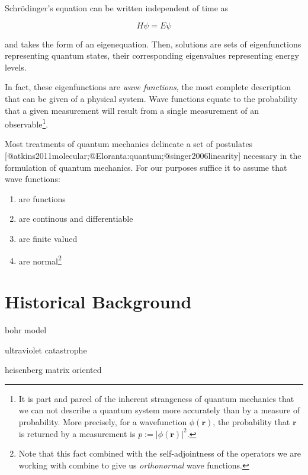 \documentclass[12pt,]{book}
\newenvironment{Shaded}{}{}
\providecommand{\tightlist}{%
  \setlength{\itemsep}{0pt}\setlength{\parskip}{0pt}}
\begin{document}
Schrödinger's equation can be written independent of time as

\begin{equation}H\psi=E\psi\label{eq:time_independent_schrodinger}\end{equation}

and takes the form of an eigenequation. Then, solutions are sets of
eigenfunctions representing quantum states, their corresponding
eigenvalues representing energy levels.

In fact, these eigenfunctions are \emph{wave functions}, the most
complete description that can be given of a physical system. Wave
functions equate to the probability that a given measurement will result
from a single measurement of an
observable\footnote{It is part and parcel of the inherent strangeness of quantum mechanics that we can not describe a quantum system more accurately than by a measure of probability. More precisely, for a wavefunction $\phi(\mathbf{r})$, the probability that $\mathbf{r}$ is returned by a measurement is $p:=\rvert \phi(\mathbf{r})\rvert^2$.}.

Most treatments of quantum mechanics delineate a set of postulates
{[}@atkins2011molecular;@Eloranta:quantum;@singer2006linearity{]}
necessary in the formulation of quantum mechanics. For our purposes
suffice it to assume that wave functions:

\begin{enumerate}
\def\labelenumi{\arabic{enumi}.}
\tightlist
\item
  are functions
\item
  are continous and differentiable
\item
  are finite valued
\item
  are
  normal\footnote{Note that this fact combined with the self-adjointness of the
  operators we are working with combine to give us \emph{orthonormal} wave functions.}
\end{enumerate}

\section{Historical Background}\label{historical-background}

bohr model

ultraviolet catastrophe

heisenberg matrix oriented

\begin{Shaded}
\begin{Highlighting}[]

\end{Highlighting}
\end{Shaded}
\end{document}
